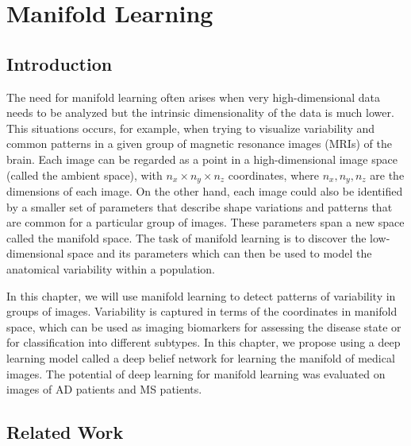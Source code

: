 \chapter{Manifold Learning}

\section{Introduction}


The need for manifold learning often arises when very high-dimensional data
needs to be analyzed but the intrinsic dimensionality of the data is much lower.
This situations occurs, for example, when trying to visualize variability and
common patterns in a given group of magnetic resonance images (MRIs) of the
brain. Each image can be regarded as a point in a high-dimensional image space
(called the ambient space), with $n_x \times n_y \times n_z$ coordinates, where
$n_x, n_y, n_z$ are the dimensions of each image. On the other hand, each image
could also be identified by a smaller set of parameters that describe shape
variations and patterns that are common for a particular group of images. These
parameters span a new space called the manifold space. The task of manifold
learning is to discover the low-dimensional space and its parameters which can
then be used to model the anatomical variability within a population.

In this chapter, we will use manifold learning to detect patterns of variability
in groups of images. Variability is captured in terms of the coordinates in
manifold space, which can be used as imaging biomarkers for assessing the
disease state or for classification into different subtypes. In this chapter, we
propose using a deep learning model called a deep belief network for learning
the manifold of medical images. The potential of deep learning for manifold
learning was evaluated on images of AD patients and MS patients.


\section{Related Work}


